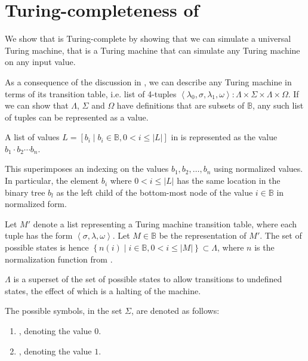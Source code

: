 \section{Turing-completeness of \D{}}

We show that \D{} is Turing-complete by showing that we can simulate a
universal Turing machine, that is a Turing machine that can simulate any Turing
machine on any input value. 

As a consequence of the discussion in , we can
describe any Turing machine in terms of its transition table, i.e.  list of
4-tuples $\left\langle \lambda_0, \sigma, \lambda_1, \omega \right\rangle :
\Lambda \times \Sigma \times \Lambda \times \Omega$. If we can show that
$\Lambda$, $\Sigma$ and $\Omega$ have definitions that are subsets of
$\mathbb{B}$, any such list of tuples can be represented as a \D{} value. 

\begin{definition} A list of values $L=\left[ b_i \mid b_i\in\mathbb{B}, 0 < i
\leq |L| \right]$ in \D{} is represented as the value $b_1\cdot b_2\cdots
b_n$.\end{definition}

This superimposes an indexing on the values $b_1,b_2,\ldots,b_n$ using
normalized \D{} values. In particular, the element $b_i$ where $0<i\leq|L|$ has
the same location in the binary tree $b_l$ as the left child of the bottom-most
node of the value $i\in\mathbb{B}$ in normalized form.

\begin{definition} Let $M'$ denote a list representing a Turing machine
transition table, where each tuple has the form $\left\langle \sigma, \lambda,
\omega \right\rangle$. Let $M\in\mathbb{B}$ be the \D{} representation of $M'$.
The set of possible states is hence $\left\{ n(i)\mid i\in\mathbb{B},
0<i\leq|M| \right\}\subset\Lambda$, where $n$ is the normalization
function from .\end{definition}

$\Lambda$ is a superset of the set of possible states to allow transitions to
undefined states, the effect of which is a halting of the machine.

\begin{definition}\label{definition:turing-alphabet} The possible symbols, in
the set $\Sigma$, are denoted as follows:

\begin{enumerate}

\item {}, denoting the value $0$.

\item {}, denoting the value $1$.

\end{enumerate}

\end{definition}

